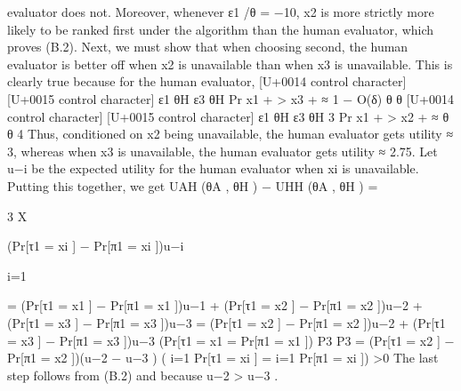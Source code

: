\documentclass[10pt]{article}
\begin{document}
\begin{ReviewVerbatim}
evaluator does not. Moreover, whenever ε1 /θ = −10, x2 is more strictly more likely to be ranked first under
the algorithm than the human evaluator, which proves (B.2).
Next, we must show that when choosing second, the human evaluator is better off when x2 is unavailable
than when x3 is unavailable. This is clearly true because for the human evaluator,
[U+0014 control character]
[U+0015 control character]
ε1 θH
ε3 θH
Pr x1 +
> x3 +
≈ 1 − O(δ)
θ
θ
[U+0014 control character]
[U+0015 control character]
ε1 θH
ε3 θH
3
Pr x1 +
> x2 +
≈
θ
θ
4
Thus, conditioned on x2 being unavailable, the human evaluator gets utility ≈ 3, whereas when x3 is
unavailable, the human evaluator gets utility ≈ 2.75. Let u−i be the expected utility for the human evaluator
when xi is unavailable. Putting this together, we get
UAH (θA , θH ) − UHH (θA , θH )
=

3
X

(Pr[τ1 = xi ] − Pr[π1 = xi ])u−i

i=1

= (Pr[τ1 = x1 ] − Pr[π1 = x1 ])u−1 + (Pr[τ1 = x2 ] − Pr[π1 = x2 ])u−2 + (Pr[τ1 = x3 ] − Pr[π1 = x3 ])u−3
= (Pr[τ1 = x2 ] − Pr[π1 = x2 ])u−2 + (Pr[τ1 = x3 ] − Pr[π1 = x3 ])u−3
(Pr[τ1 = x1 = Pr[π1 = x1 ])
P3
P3
= (Pr[τ1 = x2 ] − Pr[π1 = x2 ])(u−2 − u−3 )
( i=1 Pr[τ1 = xi ] = i=1 Pr[π1 = xi ])
>0
The last step follows from (B.2) and because u−2 > u−3 .
\end{ReviewVerbatim}
\end{document}
